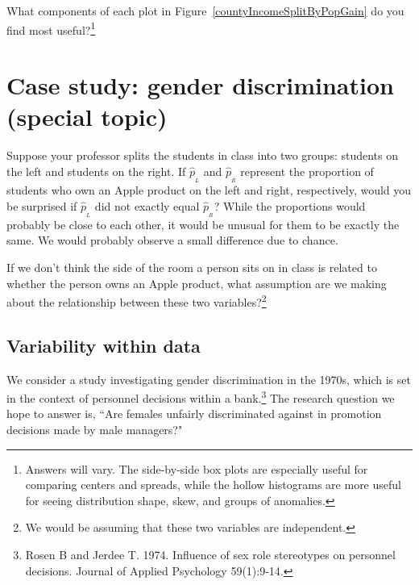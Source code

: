 \begin{exercise}
What components of each plot in Figure~\ref{countyIncomeSplitByPopGain} do you find most useful?\footnote{Answers will vary. The side-by-side box plots are especially useful for comparing centers and spreads, while the hollow histograms are more useful for seeing distribution shape, skew, and groups of anomalies.}
\end{exercise}



\section[Case study: gender discrimination (special topic)]{Case study: gender discrimination  \\(special topic)}
\label{caseStudyGenderDiscrimination}


\begin{example}{Suppose your professor splits the students in class into two groups: students on the left and students on the right. If $\hat{p}_{_L}$ and $\hat{p}_{_R}$ represent the proportion of students who own an Apple product on the left and right, respectively, would you be surprised if $\hat{p}_{_L}$ did not {exactly} equal $\hat{p}_{_R}$?}\label{classRightLeftSideApple}
While the proportions would probably be close to each other, it would be unusual for them to be exactly the same. We would probably observe a small difference due to {chance}.
\end{example}

\begin{exercise}
If we don't think the side of the room a person sits on in class is related to whether the person owns an Apple product, what assumption are we making about the relationship between these two variables?\footnote{We would be assuming that these two variables are independent.}
\end{exercise}

\subsection{Variability within data}
\label{variabilityWithinData}

We consider a study investigating gender discrimination in the 1970s, which is set in the context of personnel decisions within a bank.\footnote{Rosen B and Jerdee T. 1974. Influence of sex role stereotypes on personnel decisions. Journal of Applied Psychology 59(1):9-14.} The research question we hope to answer is, ``Are females unfairly discriminated against in promotion decisions made by male managers?"

